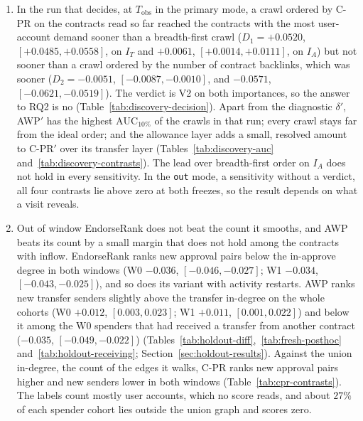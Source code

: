 \begin{enumerate}
\item[C1.] In the run that decides, at $T_{\mathrm{obs}}$ in the primary mode, a crawl ordered by \mbox{C-PR} on the contracts read so far reached the contracts with the most user-account demand sooner than a breadth-first crawl ($D_1=+0.0520$, $[+0.0485,+0.0558]$, on $I_T$ and $+0.0061$, $[+0.0014,+0.0111]$, on $I_A$) but not sooner than a crawl ordered by the number of contract backlinks, which was sooner ($D_2=-0.0051$, $[-0.0087,-0.0010]$, and $-0.0571$, $[-0.0621,-0.0519]$). The verdict is V2 on both importances, so the answer to RQ2 is no (Table~\ref{tab:discovery-decision}). Apart from the diagnostic $\delta'$, AWP$'$ has the highest $\mathrm{AUC}_{10\%}$ of the crawls in that run; every crawl stays far from the ideal order; and the allowance layer adds a small, resolved amount to \mbox{C-PR}$'$ over its transfer layer (Tables~\ref{tab:discovery-auc} and~\ref{tab:discovery-contrasts}). The lead over breadth-first order on $I_A$ does not hold in every sensitivity. In the \texttt{out} mode, a sensitivity without a verdict, all four contrasts lie above zero at both freezes, so the result depends on what a visit reveals.
\item[C2.] Out of window EndorseRank does not beat the count it smooths, and AWP beats its count by a small margin that does not hold among the contracts with inflow. EndorseRank ranks new approval pairs below the in-approve degree in both windows (W0 $-0.036$, $[-0.046,-0.027]$; W1 $-0.034$, $[-0.043,-0.025]$), and so does its variant with activity restarts. AWP ranks new transfer senders slightly above the transfer in-degree on the whole cohorts (W0 $+0.012$, $[0.003,0.023]$; W1 $+0.011$, $[0.001,0.022]$) and below it among the W0 spenders that had received a transfer from another contract ($-0.035$, $[-0.049,-0.022]$) (Tables~\ref{tab:holdout-diff},~\ref{tab:fresh-posthoc} and~\ref{tab:holdout-receiving}; Section~\ref{sec:holdout-results}). Against the union in-degree, the count of the edges it walks, \mbox{C-PR} ranks new approval pairs higher and new senders lower in both windows (Table~\ref{tab:cpr-contrasts}). The labels count mostly user accounts, which no score reads, and about $27\%$ of each spender cohort lies outside the union graph and scores zero.

\end{enumerate}
